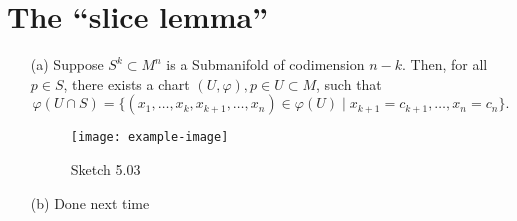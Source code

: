 \section{The ``slice lemma''}

\begin{theorem}\label{thm:5.3}
    \begin{enumerate}
        \item[(a)] Suppose \(S^k\subset M^n\) is a Submanifold of codimension \(n-k\).
                   Then, for all \(p\in S\), there exists a chart \((U,\varphi),p\in U\subset M\), such that \[\varphi(U\cap S)=\{(x_1,\dots,x_k,x_{k+1},\dots,x_n)\in \varphi(U)\mid x_{k+1}=c_{k+1},\dots,x_{n}=c_n\}.\]  
        \begin{figure}[H]
            \centering
            \texttt{[image: example-image]}
            \caption{Sketch 5.03}
        \end{figure}
        \item[(b)] Done next time
    \end{enumerate}
\end{theorem}



